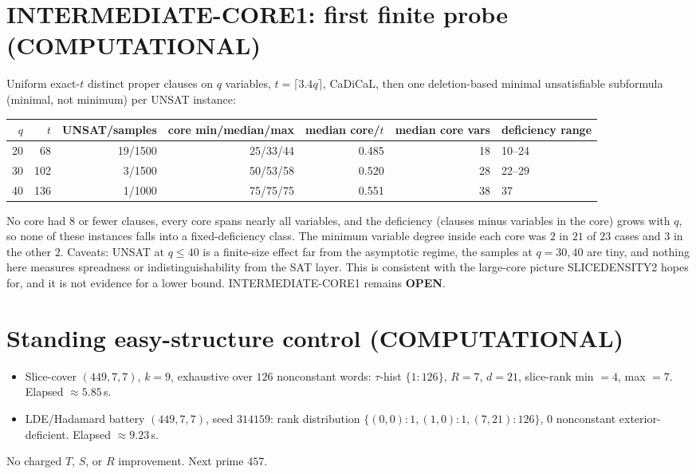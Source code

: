 \documentclass[11pt]{article}
\begin{document}
\section*{INTERMEDIATE-CORE1: first finite probe (COMPUTATIONAL)}
Uniform exact-$t$ distinct proper clauses on $q$ variables, $t=\lceil3.4q\rceil$, CaDiCaL, then one deletion-based minimal unsatisfiable subformula (minimal, not minimum) per UNSAT instance:
\begin{center}
\begin{tabular}{rrrrrrl}
$q$ & $t$ & UNSAT/samples & core min/median/max & median core/$t$ & median core vars & deficiency range\\\hline
20 & 68 & 19/1500 & 25/33/44 & 0.485 & 18 & 10--24\\
30 & 102 & 3/1500 & 50/53/58 & 0.520 & 28 & 22--29\\
40 & 136 & 1/1000 & 75/75/75 & 0.551 & 38 & 37\\
\end{tabular}
\end{center}
No core had $8$ or fewer clauses, every core spans nearly all variables, and the deficiency (clauses minus variables in the core) grows with $q$, so none of these instances falls into a fixed-deficiency class. The minimum variable degree inside each core was $2$ in $21$ of $23$ cases and $3$ in the other $2$.
Caveats: UNSAT at $q\le40$ is a finite-size effect far from the asymptotic regime, the samples at $q=30,40$ are tiny, and nothing here measures spreadness or indistinguishability from the SAT layer. This is consistent with the large-core picture SLICEDENSITY2 hopes for, and it is not evidence for a lower bound. INTERMEDIATE-CORE1 remains \textbf{OPEN}.

\section*{Standing easy-structure control (COMPUTATIONAL)}
\begin{itemize}
\item Slice-cover $(449,7,7)$, $k=9$, exhaustive over $126$ nonconstant words: $\tau$-hist $\{1{:}126\}$, $R=7$, $d=21$, slice-rank min $=4$, max $=7$. Elapsed $\approx5.85$\,s.
\item LDE/Hadamard battery $(449,7,7)$, seed $314159$: rank distribution $\{(0,0){:}1,(1,0){:}1,(7,21){:}126\}$, $0$ nonconstant exterior-deficient. Elapsed $\approx9.23$\,s.
\end{itemize}
No charged $T$, $S$, or $R$ improvement. Next prime $457$.
\end{document}
